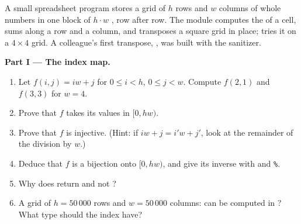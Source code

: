 \begin{problem}\label{pb:b1:pointers-and-arrays:1}
A small spreadsheet program stores a grid of $h$ rows and $w$ columns of whole numbers in one block of $h \cdot w$
, row after row. The module  computes the  of a cell, sums along a row and a column, and
transposes a square grid in place;  tries it on a $4 \times 4$ grid. A colleague's first transpose,
, was built with the  sanitizer.
\label{lst:b1:pointers-and-arrays:grid}
\label{out:b1:pointers-and-arrays:sheet}
\label{lst:b1:pointers-and-arrays:bug}
\label{out:b1:pointers-and-arrays:bug}

\medskip\noindent\textbf{Part I --- The index map.}
\begin{enumerate}
\item Let $f(i, j) = i w + j$ for $0 \leq i < h$, $0 \leq j < w$. Compute $f(2, 1)$ and $f(3, 3)$ for $w = 4$.
\item Prove that $f$ takes its values in $[0, hw)$.
\item Prove that $f$ is injective. (Hint: if $iw + j = i'w + j'$, look at the remainder of the division by $w$.)
\item Deduce that $f$ is a bijection onto $[0, hw)$, and give its inverse with \code{/} and \texttt{\%}.
\item Why does  return  and not ?
\item A grid of $h = 50\,000$ rows and $w = 50\,000$ columns: can  be computed in ? What
type should the index have?
\end{enumerate}


\end{problem}
